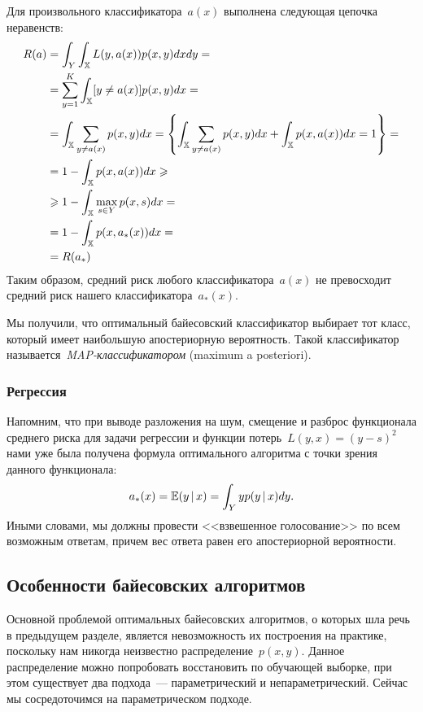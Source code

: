 \documentclass[12pt,fleqn]{article}
\begin{document}
Для произвольного классификатора~$a(x)$ выполнена
следующая цепочка неравенств:
\begin{align*}
    R(a)
    &=
    \int_{Y} \int_{\mathbb{X}} L(y, a(x)) p(x, y) dx dy
    =
    \\
    &=
    \sum_{y = 1}^{K} \int_{\mathbb{X}} [y \neq a(x)] p(x, y) dx
    =
    \\
    &=
    \int_{\mathbb{X}} \sum_{y \neq a(x)} p(x, y) dx
    =
    \left\{
    \int_{\mathbb{X}} \sum_{y \neq a(x)} p(x, y) dx
    +
    \int_{\mathbb{X}} p(x, a(x)) dx
    =
    1
    \right\}
    =
    \\
    &=
    1 - \int_{\mathbb{X}} p(x, a(x)) dx
    \geqslant\\
    &\geqslant
    1 - \int_{\mathbb{X}} \max_{s \in Y} p(x, s) dx
    =
    \\
    &=
    1 - \int_{\mathbb{X}} p(x, a_*(x)) dx
    =
    \\
    &=
    R(a_*)
\end{align*}
Таким образом, средний риск любого классификатора~$a(x)$
не превосходит средний риск нашего классификатора~$a_*(x)$.

Мы получили, что оптимальный байесовский классификатор
выбирает тот класс, который имеет наибольшую апостериорную вероятность.
Такой классификатор называется~\emph{MAP-классификатором} (maximum a posteriori).

\subsubsection{Регрессия}

Напомним, что при выводе разложения на шум, смещение и разброс функционала среднего риска для задачи регрессии и функции потерь~$L(y, x) = (y - s)^2$ нами уже была получена формула оптимального алгоритма с точки зрения данного функционала:
\[
    a_*(x) = \mathbb{E} (y \mspace{3mu}{|}\mspace{3mu} x)
    =
    \int_Y y p(y \mspace{3mu}{|}\mspace{3mu} x) dy.
\]
Иными словами, мы должны провести <<взвешенное голосование>>
по всем возможным ответам, причем вес ответа равен его
апостериорной вероятности.

\subsection{Особенности байесовских алгоритмов}
Основной проблемой оптимальных байесовских алгоритмов,
о которых шла речь в предыдущем разделе, является
невозможность их построения на практике, поскольку нам никогда
неизвестно распределение~$p(x, y)$.
Данное распределение можно попробовать восстановить по обучающей выборке,
при этом существует два подхода~--- параметрический и непараметрический.
Сейчас мы сосредоточимся на параметрическом подходе.
\end{document}
